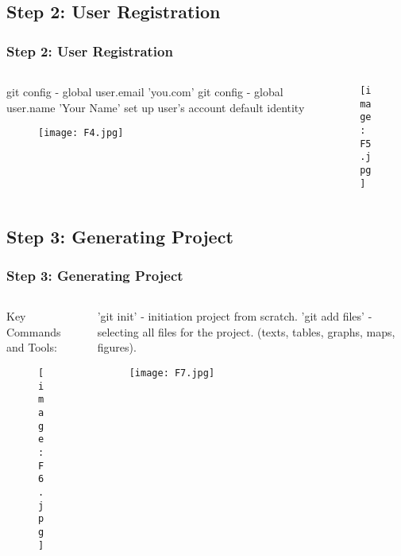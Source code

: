 \documentclass[pdflatex,compress,8pt,
	xcolor={dvipsnames,dvipsnames,svgnames,x11names,table},
	hyperref={
	breaklinks = true, 
	pdfauthor={Lemenkova Polina}, 
	pdfsubject={Preentation}, 
	pdfcreator={Lemenkova Polina}, 
	pdfproducer={Lemenkova Polina}, 
	colorlinks=true,linkcolor=blue, 
	citecolor=NavyBlue, 
	urlcolor = NavyBlue, 
	breaklinks = true}]{beamer}
\begin{document}
\subsection{Step 2: User Registration}
\begin{frame}\frametitle{Step 2: User Registration}
\begin{minipage}[0.4\textheight]{\textwidth}
\begin{columns}[T]
\begin{column}{0.5\textwidth}
\vspace{2em}
git config - global user.email 'you\@example.com' git config - global user.name 'Your Name'
set up user’s account default identity
\begin{figure}[H]
	\centering
		\texttt{[image: F4.jpg]}
\end{figure}
\end{column}
\begin{column}{0.5\textwidth}
\vspace{1em} 
\begin{figure}[H]
	\centering
		\texttt{[image: F5.jpg]}
\end{figure}
\end{column}
\end{columns}
\end{minipage}
\end{frame}

\subsection{Step 3: Generating Project}
\begin{frame}\frametitle{Step 3: Generating Project}
\begin{minipage}[0.4\textheight]{\textwidth}
\begin{columns}[T]
\begin{column}{0.5\textwidth}
\vspace{2em}
Key Commands and Tools:
\begin{figure}[H]
	\centering
		\texttt{[image: F6.jpg]}
\end{figure}
\end{column}
\begin{column}{0.5\textwidth}
\vspace{2em} 
'git init' - initiation project from scratch. 'git add files' - selecting all files for the project. 
(texts, tables, graphs, maps, figures).
\begin{figure}[H]
	\centering
		\texttt{[image: F7.jpg]}
\end{figure}
\end{column}
\end{columns}
\end{minipage}
\end{frame}
\end{document}
